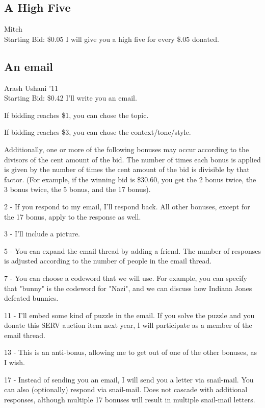 \documentclass[11pt]{article}
\begin{document}
\subsection{A High Five}
Mitch
\\
Starting Bid: \$0.05
\newline
I will give you a high five for every \$.05 donated.
\subsection{An email}
Arash Ushani '11
\\
Starting Bid: \$0.42
\newline
I'll write you an email.

If bidding reaches \$1, you can chose the topic.

If bidding reaches \$3, you can chose the context/tone/style.

Additionally, one or more of the following bonuses may occur according to the divisors of the cent amount of the bid. The number of times each bonus is applied is given by the number of times the cent amount of the bid is divisible by that factor. (For example, if the winning bid is \$30.60, you get the 2 bonus twice, the 3 bonus twice, the 5 bonus, and the 17 bonus). 

2 - If you respond to my email, I'll respond back. All other bonuses, except for the 17 bonus, apply to the response as well.

3 - I'll include a picture.

5 - You can expand the email thread by adding a friend. The number of responses is adjusted according to the number of people in the email thread.

7 - You can choose a codeword that we will use. For example, you can specify that "bunny" is the codeword for "Nazi", and we can discuss how Indiana Jones defeated bunnies.

11 - I'll embed some kind of puzzle in the email. If you solve the puzzle and you donate this SERV auction item next year, I will participate as a member of the email thread.

13 - This is an anti-bonus, allowing me to get out of one of the other bonuses, as I wish.

17 - Instead of sending you an email, I will send you a letter via snail-mail. You can also (optionally) respond via snail-mail. Does not cascade with additional responses, although multiple 17 bonuses will result in multiple snail-mail letters.
\end{document}

